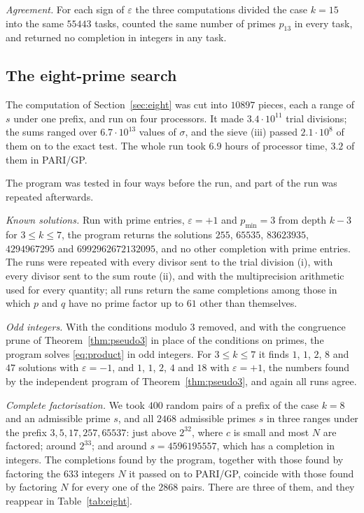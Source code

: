 \documentclass[11pt,reqno]{amsart}
\numberwithin{equation}{section}
\theoremstyle{plain}
\theoremstyle{definition}
\theoremstyle{remark}
\begin{document}
\emph{Agreement.} For each sign of $\varepsilon$ the three
computations divided the case $k=15$ into the same $55443$ tasks,
counted the same number of primes $p_{13}$ in every task, and returned
no completion in integers in any task.

\subsection{The eight-prime search}\label{sec:checks8}
The computation of Section~\ref{sec:eight} was cut into $10897$
pieces, each a range of $s$ under one prefix, and run on four
processors. It made $3.4\cdot10^{11}$ trial divisions; the sums ranged
over $6.7\cdot10^{13}$ values of $\sigma$, and the sieve (iii) passed
$2.1\cdot10^{8}$ of them on to the exact test. The whole run took
$6.9$ hours of processor time, $3.2$ of them in PARI/GP.

The program was tested in four ways before the run, and part of the
run was repeated afterwards.

\emph{Known solutions.} Run with prime entries, $\varepsilon=+1$ and
$p_{\min}=3$ from depth $k-3$ for $3\le k\le7$, the program returns
the solutions $255$, $65535$, $83623935$, $4294967295$ and
$6992962672132095$, and no other completion with prime entries. The
runs were repeated with every divisor sent to the trial division (i),
with every divisor sent to the sum route (ii), and with the
multiprecision arithmetic used for every quantity; all runs return the
same completions among those in which $p$ and $q$ have no prime factor
up to $61$ other than themselves.

\emph{Odd integers.} With the conditions modulo $3$ removed, and with
the congruence prune of Theorem~\ref{thm:pseudo3} in place of the
conditions on primes, the program solves \eqref{eq:product} in odd
integers. For $3\le k\le7$ it finds $1$, $1$, $2$, $8$ and $47$
solutions with $\varepsilon=-1$, and $1$, $1$, $2$, $4$ and $18$ with
$\varepsilon=+1$, the numbers found by the independent program of
Theorem~\ref{thm:pseudo3}, and again all runs agree.

\emph{Complete factorisation.} We took $400$ random pairs of a prefix
of the case $k=8$ and an admissible prime $s$, and all $2468$
admissible primes $s$ in three ranges under the prefix
$3,5,17,257,65537$: just above $2^{32}$, where $c$ is small and most
$N$ are factored; around $2^{33}$; and around $s=4596195557$, which
has a completion in integers. The completions found by the program,
together with those found by factoring the $633$ integers $N$ it
passed on to PARI/GP, coincide with those found by factoring $N$ for
every one of the $2868$ pairs. There are three of them, and they
reappear in Table~\ref{tab:eight}.
\end{document}
